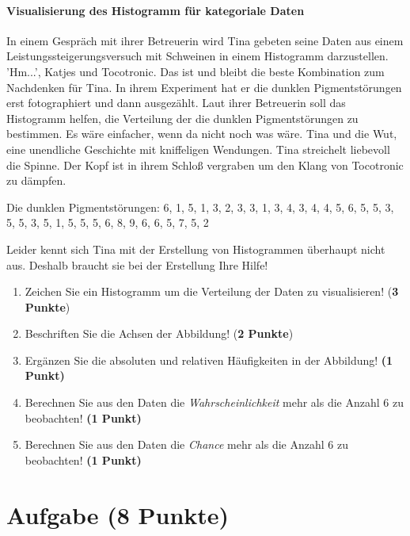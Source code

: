 \documentclass[a4paper, 9pt]{scrartcl}\usepackage[]{graphicx}\usepackage[]{xcolor}
\begin{document}
\ifcollection
\paragraph{Visualisierung des Histogramm für kategoriale Daten}
\fi

In einem Gespräch mit ihrer Betreuerin wird Tina gebeten seine Daten aus einem Leistungssteigerungsversuch mit Schweinen in einem Histogramm darzustellen. 'Hm...', Katjes und Tocotronic. Das ist und bleibt die beste Kombination zum Nachdenken für Tina. In ihrem Experiment hat er die dunklen Pigmentstörungen erst fotographiert und dann ausgezählt. Laut ihrer Betreuerin soll das Histogramm helfen, die Verteilung der die dunklen Pigmentstörungen zu bestimmen. Es wäre einfacher, wenn da nicht noch was wäre. Tina und die Wut, eine unendliche Geschichte mit kniffeligen Wendungen. Tina streichelt liebevoll die Spinne. Der Kopf ist in ihrem Schloß vergraben um den Klang von Tocotronic zu dämpfen.

\begin{center}
Die dunklen Pigmentstörungen: 6, 1, 5, 1, 3, 2, 3, 3, 1, 3, 4, 3, 4, 4, 5, 6, 5, 5, 3, 5, 5, 3, 5, 1, 5, 5, 5, 6, 8, 9, 6, 6, 5, 7, 5, 2
\end{center}

Leider kennt sich Tina mit der Erstellung von Histogrammen überhaupt nicht aus. Deshalb braucht sie bei der Erstellung Ihre Hilfe!

\begin{enumerate}
\item Zeichen Sie ein Histogramm um die Verteilung der Daten zu visualisieren! (\textbf{3 Punkte})
\item Beschriften Sie die Achsen der Abbildung! (\textbf{2 Punkte})
\item Ergänzen Sie die absoluten und relativen Häufigkeiten in der
  Abbildung! \textbf{(1 Punkt)}
\item Berechnen Sie aus den Daten die \textit{Wahrscheinlichkeit}
  mehr als die Anzahl 6 zu beobachten! \textbf{(1
    Punkt)}
\item Berechnen Sie aus den Daten die \textit{Chance} mehr
  als die Anzahl 6 zu beobachten! \textbf{(1 Punkt)}
\end{enumerate}

 
\clearpage

\section{Aufgabe \hfill (8 Punkte)}
\end{document}
